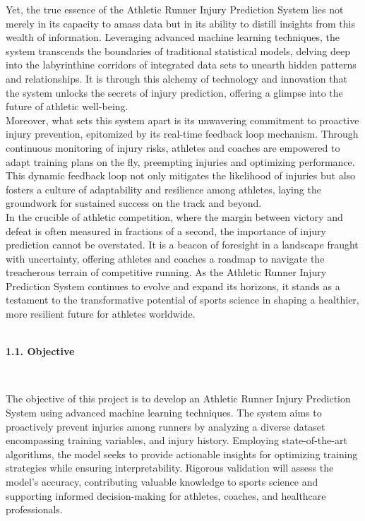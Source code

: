 \documentclass[12pt, English]{article}
\newcommand\tab[1][1cm]{\hspace*{#1}}
\begin{document}
\begin{normalsize}
\tab Yet, the true essence of the Athletic Runner Injury Prediction System lies not merely in its capacity to amass data but in its ability to distill insights from this wealth of information. Leveraging advanced machine learning techniques, the system transcends the boundaries of traditional statistical models, delving deep into the labyrinthine corridors of integrated data sets to unearth hidden patterns and relationships. It is through this alchemy of technology and innovation that the system unlocks the secrets of injury prediction, offering a glimpse into the future of athletic well-being.\\

\tab Moreover, what sets this system apart is its unwavering commitment to proactive injury prevention, epitomized by its real-time feedback loop mechanism. Through continuous monitoring of injury risks, athletes and coaches are empowered to adapt training plans on the fly, preempting injuries and optimizing performance. This dynamic feedback loop not only mitigates the likelihood of injuries but also fosters a culture of adaptability and resilience among athletes, laying the groundwork for sustained success on the track and beyond.\\

\tab In the crucible of athletic competition, where the margin between victory and defeat is often measured in fractions of a second, the importance of injury prediction cannot be overstated. It is a beacon of foresight in a landscape fraught with uncertainty, offering athletes and coaches a roadmap to navigate the treacherous terrain of competitive running. As the Athletic Runner Injury Prediction System continues to evolve and expand its horizons, it stands as a testament to the transformative potential of sports science in shaping a healthier, more resilient future for athletes worldwide.
\\\\
\begin{large}
\textbf{1.1. Objective}
\end{large}
\\
\begin{normalsize}
\tab The objective of this project is to develop an Athletic Runner Injury Prediction System using advanced machine learning techniques. The system aims to proactively prevent injuries among runners by analyzing a diverse dataset encompassing training variables, and injury history. Employing state-of-the-art algorithms, the model seeks to provide actionable insights for optimizing training strategies while ensuring interpretability. Rigorous validation will assess the model's accuracy, contributing valuable knowledge to sports science and supporting informed decision-making for athletes, coaches, and healthcare professionals.\\


\end{normalsize}
\end{normalsize}
\end{document}
